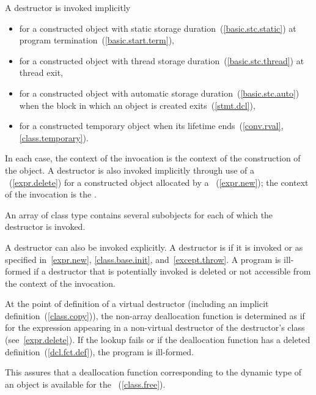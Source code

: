 \pnum
{}%
%
A destructor is invoked implicitly

\begin{itemize}

\item for a constructed object with static storage duration~(\ref{basic.stc.static}) at program termination~(\ref{basic.start.term}),

\item for a constructed object with thread storage duration~(\ref{basic.stc.thread}) at thread exit,

\item for a constructed object with automatic storage duration~(\ref{basic.stc.auto}) when the block in which an object is created exits~(\ref{stmt.dcl}),

\item for a constructed temporary object when its lifetime ends~(\ref{conv.rval}, \ref{class.temporary}).
\end{itemize}

%
%
In each case, the context of the invocation is the context of the construction of
the object. A destructor is also invoked implicitly through use of a
~(\ref{expr.delete}) for a constructed object allocated
by a ~(\ref{expr.new}); the context of the invocation is the
.
\begin{note} An array of class type contains several subobjects for each of which
the destructor is invoked. \end{note}
A destructor can also be invoked explicitly. A destructor is 
if it is invoked or as specified in~\ref{expr.new}, \ref{class.base.init},
and~\ref{except.throw}.
A program is ill-formed if a destructor that is potentially invoked is deleted
or not accessible from the context of the invocation.

\pnum
At the point of definition of a virtual destructor (including an implicit
definition~(\ref{class.copy})), the non-array deallocation function is 
determined as if for the expression  appearing in a
non-virtual destructor of the destructor's class (see~\ref{expr.delete}).
If the lookup fails or if the deallocation function has
a deleted definition~(\ref{dcl.fct.def}), the program is ill-formed.
\begin{note}
This assures that a deallocation function corresponding to the dynamic type of an
object is available for the
~(\ref{class.free}).
\end{note}

